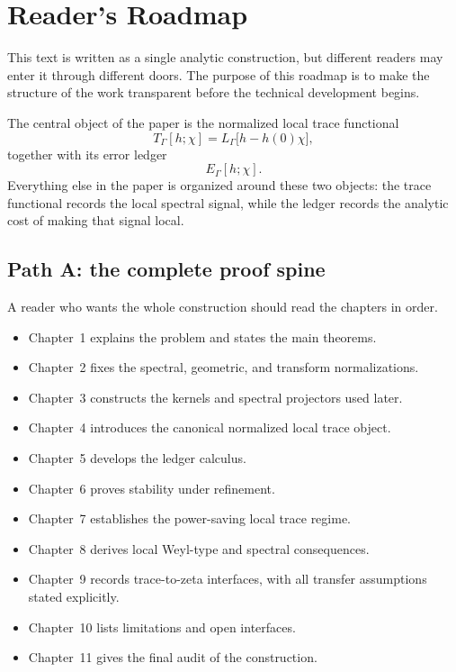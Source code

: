
\chapter*{Reader's Roadmap}

This text is written as a single analytic construction, but different readers may enter it through different doors.  The purpose of this roadmap is to make the structure of the work transparent before the technical development begins.

The central object of the paper is the normalized local trace functional
\[
  T_\Gamma[h;\chi]
  =
  L_\Gamma\big[h-h(0)\chi\big],
\]
together with its error ledger
\[
  E_\Gamma[h;\chi].
\]
Everything else in the paper is organized around these two objects: the trace functional records the local spectral signal, while the ledger records the analytic cost of making that signal local.

\section*{Path A: the complete proof spine}

A reader who wants the whole construction should read the chapters in order.

\begin{itemize}
  \item Chapter~1 explains the problem and states the main theorems.
  \item Chapter~2 fixes the spectral, geometric, and transform normalizations.
  \item Chapter~3 constructs the kernels and spectral projectors used later.
  \item Chapter~4 introduces the canonical normalized local trace object.
  \item Chapter~5 develops the ledger calculus.
  \item Chapter~6 proves stability under refinement.
  \item Chapter~7 establishes the power-saving local trace regime.
  \item Chapter~8 derives local Weyl-type and spectral consequences.
  \item Chapter~9 records trace-to-zeta interfaces, with all transfer assumptions stated explicitly.
  \item Chapter~10 lists limitations and open interfaces.
  \item Chapter~11 gives the final audit of the construction.
\end{itemize}

